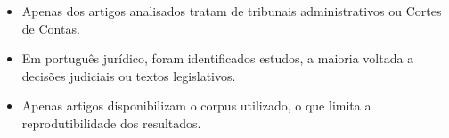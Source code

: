 \begin{itemize}
  \item Apenas \nArtigosTribunalContas{} dos \totalIncluidos{} artigos analisados tratam de tribunais administrativos ou Cortes de Contas.
  \item Em português jurídico, foram identificados \nArtigosPortugues{} estudos, a maioria voltada a decisões judiciais ou textos legislativos.
  \item Apenas \nArtigosCorpusPublico{} artigos disponibilizam o corpus utilizado, o que limita a reprodutibilidade dos resultados.
\end{itemize}

